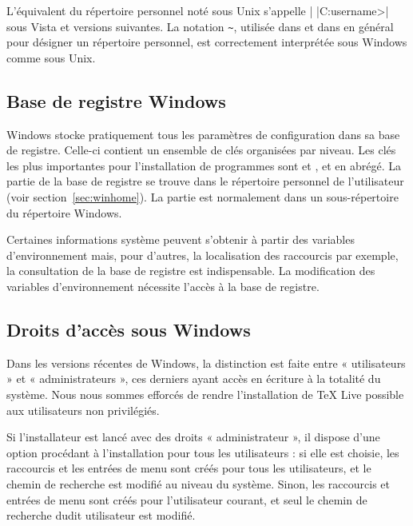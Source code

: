 \documentclass[german, english, french, 12pt]{article}
\renewcommand{\TL}{\TeX{} Live\xspace}%
\begin{document}
L'équivalent du répertoire personnel noté  sous Unix s'appelle
|%
|C:\Utilisateurs\<username>| sous Vista et versions suivantes.  La notation
\verb|~|, utilisée dans  et dans \KPS{} en général pour
désigner un répertoire personnel, est correctement interprétée sous Windows
comme sous Unix.


\subsection{Base de registre Windows}
\label{sec:registry}

Windows stocke pratiquement tous les paramètres de configuration dans sa base de
registre. Celle-ci contient un ensemble de clés organisées par niveau.  Les clés
les plus importantes pour l'installation de programmes sont
 et ,  et
 en abrégé. La partie  de la base de registre se trouve
dans le répertoire personnel de l'utilisateur (voir
section~\ref{sec:winhome}). La partie  est normalement dans un
sous-répertoire du répertoire Windows.

Certaines informations système peuvent s'obtenir à partir des variables
d'environnement mais, pour d'autres, la localisation des raccourcis par exemple,
la consultation de la base de registre est indispensable.  La modification des
variables d'environnement nécessite l'accès à la base de registre.


\subsection{Droits d'accès sous Windows}
\label{sec:winpermissions}

Dans les versions récentes de Windows, la distinction est faite entre
« utilisateurs » et « administrateurs », ces derniers ayant accès en écriture
à la totalité du système. Nous nous sommes efforcés de rendre l'installation de
\TL{} possible aux utilisateurs non privilégiés.

Si l'installateur est lancé avec des droits « administrateur », il dispose d'une
option procédant à l'installation pour tous les utilisateurs : si elle est
choisie, les raccourcis et les entrées de menu sont créés pour tous les
utilisateurs, et le chemin de recherche est modifié au niveau du système. Sinon,
les raccourcis et entrées de menu sont créés pour l'utilisateur courant, et seul
le chemin de recherche dudit utilisateur est modifié.
\end{document}
